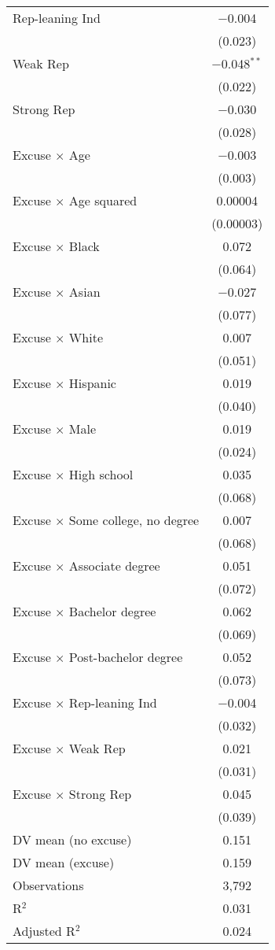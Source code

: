 \begin{center}
\begin{ThreePartTable}
\begin{longtable}{lc}
 \addlinespace 
 Rep-leaning Ind & $-$0.004 \\ 
  & (0.023) \\ 
 \addlinespace 
 Weak Rep & $-$0.048$^{**}$ \\ 
  & (0.022) \\ 
 \addlinespace 
 Strong Rep & $-$0.030 \\ 
  & (0.028) \\ 
 \addlinespace 
 Excuse $\times$ Age & $-$0.003 \\ 
  & (0.003) \\ 
 \addlinespace 
 Excuse $\times$ Age squared & 0.00004 \\ 
  & (0.00003) \\ 
 \addlinespace 
 Excuse $\times$ Black & 0.072 \\ 
  & (0.064) \\ 
 \addlinespace 
 Excuse $\times$ Asian & $-$0.027 \\ 
  & (0.077) \\ 
 \addlinespace 
 Excuse $\times$ White & 0.007 \\ 
  & (0.051) \\ 
 \addlinespace 
 Excuse $\times$ Hispanic & 0.019 \\ 
  & (0.040) \\ 
 \addlinespace 
 Excuse $\times$ Male & 0.019 \\ 
  & (0.024) \\ 
 \addlinespace 
 Excuse $\times$ High school & 0.035 \\ 
  & (0.068) \\ 
 \addlinespace 
 Excuse $\times$ Some college, no degree & 0.007 \\ 
  & (0.068) \\ 
 \addlinespace 
 Excuse $\times$ Associate degree & 0.051 \\ 
  & (0.072) \\ 
 \addlinespace 
 Excuse $\times$ Bachelor degree & 0.062 \\ 
  & (0.069) \\ 
 \addlinespace 
 Excuse $\times$ Post-bachelor degree & 0.052 \\ 
  & (0.073) \\ 
 \addlinespace 
 Excuse $\times$ Rep-leaning Ind & $-$0.004 \\ 
  & (0.032) \\ 
 \addlinespace 
 Excuse $\times$ Weak Rep & 0.021 \\ 
  & (0.031) \\ 
 \addlinespace 
 Excuse $\times$ Strong Rep & 0.045 \\ 
  & (0.039) \\ 
 \addlinespace 
DV mean (no excuse) & 0.151 \\
DV mean (excuse) & 0.159 \\
 \addlinespace 
\midrule  
Observations & 3,792 \\ 
R$^{2}$ & 0.031 \\ 
Adjusted R$^{2}$ & 0.024 \\ 
\end{longtable}
\end{ThreePartTable}
\end{center}
